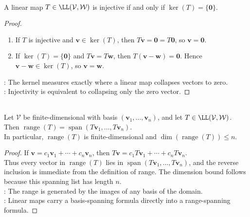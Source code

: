 \begin{proposition} \label{prop:injective-iff-kernel-zero} \\
A linear map $T \in \LL(\mathcal{V}, \mathcal{W})$ is injective if and only if $\ker(T) = \{ \mathbf{0} \}$.
\begin{proof}
\begin{enumerate}[label=\roman*.]
\setlength{\itemsep}{0pt}
\item[$(\Rightarrow)$] If $T$ is injective and $\mathbf{v}\in\ker(T)$, then $T\mathbf{v}=\mathbf{0}=T\mathbf{0}$, so $\mathbf{v}=\mathbf{0}$.
\item[$(\Leftarrow)$] If $\ker(T)=\{\mathbf{0}\}$ and $T\mathbf{v}=T\mathbf{w}$, then $T(\mathbf{v}-\mathbf{w})=\mathbf{0}$. Hence $\mathbf{v}-\mathbf{w}\in\ker(T)$, so $\mathbf{v}=\mathbf{w}$.
\end{enumerate}
: The kernel measures exactly where a linear map collapses vectors to zero.\\
: Injectivity is equivalent to collapsing only the zero vector.
\end{proof}
\end{proposition}

\begin{theorem} \label{thm:range-spanned-by-images-of-basis} \\
Let $\mathcal{V}$ be finite-dimensional with basis $(\mathbf{v}_1,\ldots,\mathbf{v}_n)$, and let $T\in\LL(\mathcal{V},\mathcal{W})$. Then $\operatorname{range}(T)=\operatorname{span}(T\mathbf{v}_1,\ldots,T\mathbf{v}_n)$.\\
In particular, $\operatorname{range}(T)$ is finite-dimensional and $\dim(\operatorname{range}(T))\leq n$.
\begin{proof}
If $\mathbf{v}=c_1\mathbf{v}_1+\cdots+c_n\mathbf{v}_n$, then $T\mathbf{v}=c_1T\mathbf{v}_1+\cdots+c_nT\mathbf{v}_n$.\\
Thus every vector in $\operatorname{range}(T)$ lies in $\operatorname{span}(T\mathbf{v}_1,\ldots,T\mathbf{v}_n)$, and the reverse inclusion is immediate from the definition of range. The dimension bound follows because this spanning list has length $n$.\\
: The range is generated by the images of any basis of the domain.\\
: Linear maps carry a basis-spanning formula directly into a range-spanning formula.
\end{proof}
\end{theorem}

